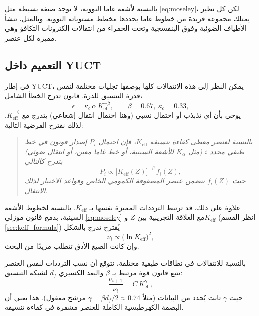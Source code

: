 \documentclass[12pt,a4paper]{article}
\theoremstyle{remark}
\begin{document}
	بالنسبة لأشعة غاما النووية، لا توجد صيغة بسيطة مثل \eqref{eq:moseley}، لكن كل نظير يمتلك مجموعة فريدة من خطوط غاما يحددها مخطط مستوياته النووية. وبالمثل، تنشأ الأطياف الضوئية وفوق البنفسجية وتحت الحمراء من انتقالات إلكترونات التكافؤ وهي مميزة لكل عنصر.
	
	\subsection{التعميم داخل YUCT}
	
	في إطار YUCT، يمكن النظر إلى هذه الانتقالات كلها بوصفها تجليات مختلفة لنفس قدرة التنسيق للذرة. قانون تدرج الخطأ الشامل،
	\begin{equation}
		\epsilon = \kappa_c \, \alpha \, K_{\mathrm{eff}}^{-\beta}, \qquad \beta = 0.67,\ \kappa_c = 0.33,
		\label{eq:universal_law}
	\end{equation}
	يوحي بأن أي تذبذب أو احتمال نسبي (وهنا احتمال انتقال إشعاعي) يتدرج مع \(K_{\mathrm{eff}}^{-\beta}\). لذلك نقترح الفرضية التالية:
	
	\begin{quote}
		\emph{بالنسبة لعنصر معطى كفاءة تنسيقه \(K_{\mathrm{eff}}\)، فإن احتمال \(P_i\) إصدار فوتون في خط طيفي محدد \(i\) (مثل \(K_\alpha\) للأشعة السينية، أو خط غاما معين، أو انتقال ضوئي) يتدرج كالتالي}
		\begin{equation}
			P_i \propto \bigl[K_{\mathrm{eff}}(Z)\bigr]^{-\beta} \, f_i(Z),
			\label{eq:prob_scaling}
		\end{equation}
		\emph{حيث \(f_i(Z)\) تتضمن عنصر المصفوفة الكمومي الخاص وقواعد الاختيار لذلك الانتقال.}
	\end{quote}
	
	علاوة على ذلك، قد ترتبط الترددات المميزة نفسها بـ \(K_{\mathrm{eff}}\). بالنسبة لخطوط الأشعة السينية، بدمج قانون موزلي \eqref{eq:moseley} مع العلاقة التجريبية بين \(Z\) و\(K_{\mathrm{eff}}\) (انظر القسم \ref{sec:keff_formula}) يُقترح تدرج بالشكل
	\begin{equation}
		\nu_i \propto \bigl(\ln K_{\mathrm{eff}}\bigr)^2,
		\label{eq:freq_scaling}
	\end{equation}
	وإن كانت الصيغ الأدق تتطلب مزيدًا من البحث.
	
	بالنسبة للانتقالات في نطاقات طيفية مختلفة، نتوقع أن نسب الترددات لنفس العنصر تتبع قانون قوة مرتبط بـ \(\beta\) والبعد الكسيري \(d_f\) لشبكة التنسيق:
	\begin{equation}
		\frac{\nu_{i+1}}{\nu_i} = C \, K_{\mathrm{eff}}^{\gamma},
		\label{eq:ratio_scaling}
	\end{equation}
	حيث \(\gamma\) ثابت يُحدد من البيانات (مثلاً \(\gamma = \beta d_f/2 \approx 0.74\) مرشح معقول). هذا يعني أن البصمة الكهرطيسية الكاملة للعنصر مشفرة في كفاءة تنسيقه.
	
\end{document}
